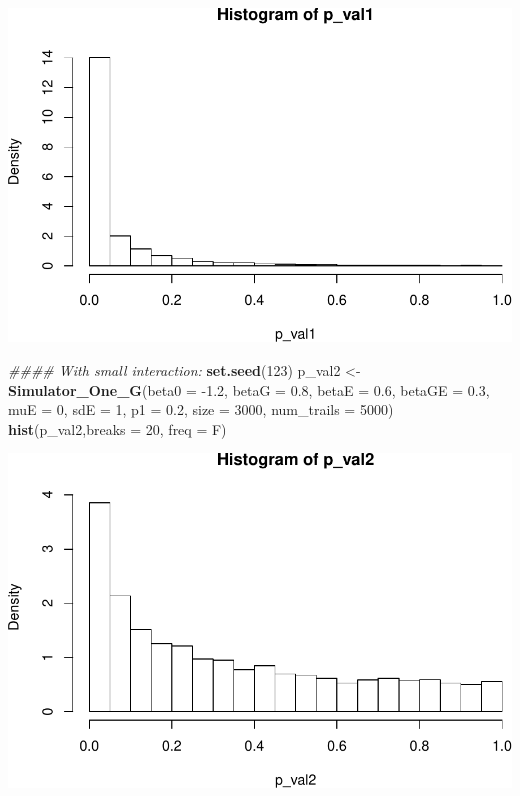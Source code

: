 \documentclass[]{article}
\newenvironment{Shaded}{\begin{snugshade}}{\end{snugshade}}
\newcommand{\CommentTok}[1]{\textcolor[rgb]{0.56,0.35,0.01}{\textit{#1}}}
\newcommand{\DataTypeTok}[1]{\textcolor[rgb]{0.13,0.29,0.53}{#1}}
\newcommand{\DecValTok}[1]{\textcolor[rgb]{0.00,0.00,0.81}{#1}}
\newcommand{\FloatTok}[1]{\textcolor[rgb]{0.00,0.00,0.81}{#1}}
\newcommand{\KeywordTok}[1]{\textcolor[rgb]{0.13,0.29,0.53}{\textbf{#1}}}
\newcommand{\NormalTok}[1]{#1}
\newcommand{\StringTok}[1]{\textcolor[rgb]{0.31,0.60,0.02}{#1}}
\begin{document}
\includegraphics{stats-gene-research-progress-v3_files/figure-latex/unnamed-chunk-1-2.pdf}

\begin{Shaded}
\begin{Highlighting}[]
\CommentTok{#### With small interaction:}
\KeywordTok{set.seed}\NormalTok{(}\DecValTok{123}\NormalTok{)}
\NormalTok{p_val2 <-}\StringTok{ }\KeywordTok{Simulator_One_G}\NormalTok{(}\DataTypeTok{beta0 =} \FloatTok{-1.2}\NormalTok{, }\DataTypeTok{betaG =} \FloatTok{0.8}\NormalTok{, }\DataTypeTok{betaE =} \FloatTok{0.6}\NormalTok{, }\DataTypeTok{betaGE =} \FloatTok{0.3}\NormalTok{, }\DataTypeTok{muE =} \DecValTok{0}\NormalTok{, }\DataTypeTok{sdE =} \DecValTok{1}\NormalTok{, }\DataTypeTok{p1 =} \FloatTok{0.2}\NormalTok{, }\DataTypeTok{size =} \DecValTok{3000}\NormalTok{, }\DataTypeTok{num_trails =} \DecValTok{5000}\NormalTok{)}
\KeywordTok{hist}\NormalTok{(p_val2,}\DataTypeTok{breaks =} \DecValTok{20}\NormalTok{, }\DataTypeTok{freq =}\NormalTok{ F)}
\end{Highlighting}
\end{Shaded}

\includegraphics{stats-gene-research-progress-v3_files/figure-latex/unnamed-chunk-1-3.pdf}
\end{document}
